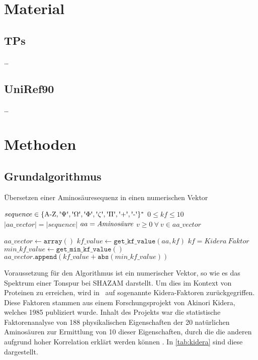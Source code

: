 \section{Material} %
\label{sec:material}
    \subsection{\aclp{TP}} %
        \label{sub:mapman}
        \dots
    \subsection{UniRef90} %
        \label{sub:uniref90}
        \dots

\section{Methoden} %
    \label{sec:methoden}
    \subsection{Grundalgorithmus} %
        \label{sub:grundalgorithmus}
        \begin{algorithm}[H]
            \caption{Übersetzen einer Aminosäuresequenz in einen numerischen Vektor}\label{alg:vorbereitung}
            \newcommand{\I}{\text{\textquotesingle}}
            \begin{algorithmic}[1]
                \Require $sequence \in \{ \text{A-Z}, \I\Psi\I, \I\Omega\I, \I\Phi\I, \I\zeta\I, \I\Pi\I, \I\text{+}\I, \I\text{-}\I\}^{*} $
                \Require $0 \leq kf \leq 10$
                \Ensure $|aa\_vector| = |sequence|$ \Comment $aa = \emph{Aminosäure}$
                \Ensure $v \geq 0\ \forall\ v \in aa\_vector$ 

                \State $aa\_vector \gets \texttt{array}()$
                    \State $kf\_value \gets \texttt{get\_kf\_value}(aa, kf)$ \Comment $kf=Kidera\ Faktor$
                    \State $min\_kf\_value \gets \texttt{get\_min\_kf\_value}()$
                    \State $aa\_vector.\texttt{append}(kf\_value + \texttt{abs}(min\_kf\_value))$
                \EndFor
            \end{algorithmic}
        \end{algorithm}
        Voraussetzung für den Algorithmus ist ein numerischer Vektor, so wie es das Spektrum einer Tonspur bei SHAZAM darstellt. Um dies im Kontext von Proteinen zu erreichen, wird in \protfin\ auf sogenannte Kidera-Faktoren zurückgegriffen. Diese Faktoren stammen aus einem Forschungsprojekt von Akinori Kidera, welches 1985 publiziert wurde. Inhalt des Projekts war die statistische Faktorenanalyse von 188 physikalischen Eigenschaften der 20 natürlichen Aminosäuren zur Ermittlung von 10 dieser Eigenschaften, durch die die anderen aufgrund hoher Korrelation erklärt werden können . In \autoref{tab:kidera} sind diese dargestellt.

